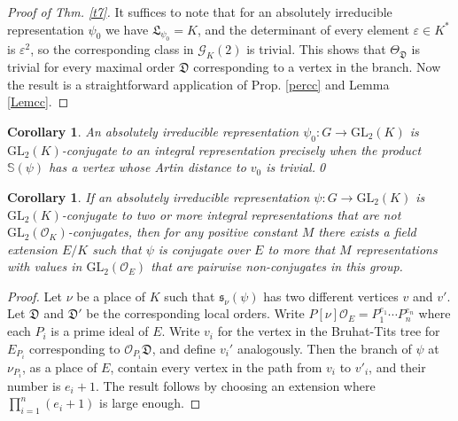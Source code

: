 \documentclass{article}
\newtheorem{Corth}[Prop]{Corollary}
\theoremstyle{definition}
\theoremstyle{remark}
\begin{document}
\begin{proof}[Proof of Thm. \ref{t7}]
    It suffices to note that for an absolutely irreducible
    representation $\psi_0$ we have $\mathfrak{L}_{\psi_0}=K$,
    and the determinant of every element $\varepsilon\in K^*$
    is $\varepsilon^2$, so the corresponding
    class in $\mathcal{G}_K(2)$ is trivial.
    This shows that $\Theta_{\mathfrak{D}}$ is trivial
    for every maximal order $\mathfrak{D}$ corresponding to a vertex in
    the branch.
    Now the result is a straightforward application of
    Prop. \ref{percc} and Lemma \ref{Lemcc}.
\end{proof}


\begin{Corth}
An absolutely irreducible representation 
$\psi_0:G\rightarrow\mathrm{GL}_2(K)$ is 
$\mathrm{GL}_2(K)$-conjugate to an integral 
representation precisely when the product 
$\mathbb{S}(\psi)$
has a vertex whose Artin distance to $v_0$ is trivial.\qed
\end{Corth}

\begin{Corth}
If an absolutely irreducible representation 
$\psi:G\rightarrow\mathrm{GL}_2(K)$ is 
$\mathrm{GL}_2(K)$-conjugate to two or more integral 
representations that are not 
$\mathrm{GL}_2(\mathcal{O}_K)$-conjugates, then
for any positive constant $M$ there exists a field extension
$E/K$ such that $\psi$ is conjugate over $E$
to more that $M$ representations with values in 
$\mathrm{GL}_2(\mathcal{O}_E)$
that are pairwise non-conjugates in this group.
\end{Corth}



\begin{proof}
    Let $\nu$ be a place of $K$ such that 
    $\mathfrak{s}_\nu(\psi)$ has two 
    different vertices $v$ and $v'$. Let $\mathfrak{D}$ and 
    $\mathfrak{D}'$ be the corresponding local orders. 
    Write $P[\nu]\mathcal{O}_E=
    P_1^{e_1}\cdots P_n^{e_n}$ where each $P_i$ 
    is a prime ideal
    of $E$. Write $v_i$ for the vertex in the 
    Bruhat-Tits tree for
    $E_{P_i}$ corresponding to $\mathcal{O}_{P_i}\mathfrak{D}$,
    and define $v_i'$ analogously.
    Then the branch of $\psi$ at $\nu_{P_i}$, 
    as a place of $E$,
    contain every vertex in the path from $v_i$ to $v'_i$,
    and their number is $e_i+1$. The result follows by
    choosing an extension where 
    $\prod_{i=1}^n(e_i+1)$ is large enough. 
\end{proof}
\end{document}
